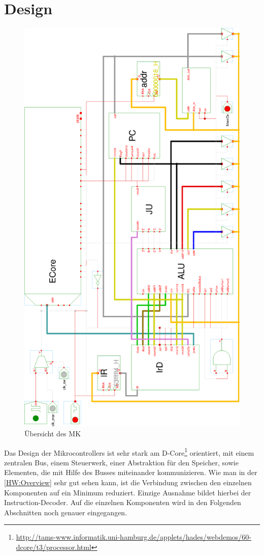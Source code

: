 \section{Design}
\begin{figure}
\vspace{-4em}
\centering
\includegraphics[width=.8\textwidth]{images/overview.eps}
\caption{\label{HW:Overview}Übersicht des MK}
\end{figure}
Das Design der Mikrocontrollers ist sehr stark am D-Core\footnote{\url{http://tams-www.informatik.uni-hamburg.de/applets/hades/webdemos/60-dcore/t3/processor.html}} orientiert, mit einem zentralen Bus, einem Steuerwerk, einer Abstraktion für den Speicher, sowie Elementen, die mit Hilfe des Busses miteinander kommunizieren. Wie man in der \autoref{HW:Overview} sehr gut sehen kann, ist die Verbindung zwischen den einzelnen Komponenten auf ein Minimum reduziert. Einzige Ausnahme bildet hierbei der Instruction-Decoder. Auf die einzelnen Komponenten wird in den Folgenden Abschnitten noch genauer eingegangen.\\
